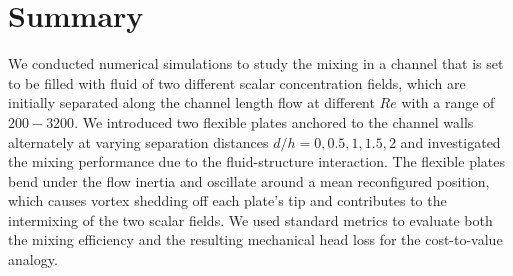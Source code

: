 \documentclass[reprint,a4paper,fleqn]{cas-dc} %
\begin{document}
		
		
		\section{Summary}
		
		We conducted numerical simulations to study the mixing in a channel that is set to be filled with fluid of two different scalar concentration fields, which are initially separated along the channel length flow at different $Re$ with a range of $200-3200$. We introduced two flexible plates anchored to the channel walls alternately at varying separation distances $d/h=0,0.5,1,1.5,2$ and investigated the mixing performance due to the fluid-structure interaction. The flexible plates bend under the flow inertia and oscillate around a mean reconfigured position, which causes vortex shedding off each plate's tip and contributes to the intermixing of the two scalar fields. We used standard metrics to evaluate both the mixing efficiency and the resulting mechanical head loss for the cost-to-value analogy.
		
\end{document}
